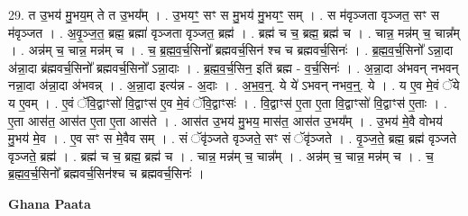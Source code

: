\documentclass[17pt]{extarticle}
\begin{document}
29. त उ॒भय॑ मु॒भय॒म् ते त उ॒भय᳚म् । . उ॒भयꣳ॒॒ सꣳ स मु॒भय॑ मु॒भयꣳ॒॒ सम् । . स म॑वृञ्जता वृञ्जत॒ सꣳ स म॑वृञ्जत । . अ॒वृ॒ञ्ज॒त॒ ब्रह्म॒ ब्रह्मा॑ वृञ्जता वृञ्जत॒ ब्रह्म॑ । . ब्रह्म॑ च च॒ ब्रह्म॒ ब्रह्म॑ च । . चान्न॒ मन्न॑म् च॒ चान्न᳚म् । . अन्न॑म् च॒ चान्न॒ मन्न॑म् च । . च॒ ब्र॒ह्म॒व॒र्च॒सिनो᳚ ब्रह्मवर्च॒सिन॑ श्च च ब्रह्मवर्च॒सिनः॑ । . ब्र॒ह्म॒व॒र्च॒सिनो᳚ ऽन्ना॒दा अ॑न्ना॒दा ब्र॑ह्मवर्च॒सिनो᳚ ब्रह्मवर्च॒सिनो᳚ ऽन्ना॒दाः । . ब्र॒ह्म॒व॒र्च॒सिन॒ इति॑ ब्रह्म - व॒र्च॒सिनः॑ । . अ॒न्ना॒दा अ॑भवन् नभवन् नन्ना॒दा अ॑न्ना॒दा अ॑भवन्न् । . अ॒न्ना॒दा इत्य॑न्न - अ॒दाः । . अ॒भ॒व॒न्॒. ये ये॑ ऽभवन् नभव॒न्॒. ये । . य ए॒व मे॒वं ॅये य ए॒वम् । . ए॒वं ॅवि॒द्वाꣳसो॑ वि॒द्वाꣳस॑ ए॒व मे॒वं ॅवि॒द्वाꣳसः॑ । . वि॒द्वाꣳस॑ ए॒ता ए॒ता वि॒द्वाꣳसो॑ वि॒द्वाꣳस॑ ए॒ताः । . ए॒ता आस॑त॒ आस॑त ए॒ता ए॒ता आस॑ते । . आस॑त उ॒भय॑ मु॒भय॒ मास॑त॒ आस॑त उ॒भय᳚म् । . उ॒भय॑ मे॒वै वोभय॑ मु॒भय॑ मे॒व । . ए॒व सꣳ स मे॒वैव सम् । . सं ॅवृ॑ञ्जते वृञ्जते॒ सꣳ सं ॅवृ॑ञ्जते । . वृ॒ञ्ज॒ते॒ ब्रह्म॒ ब्रह्म॑ वृञ्जते वृञ्जते॒ ब्रह्म॑ । . ब्रह्म॑ च च॒ ब्रह्म॒ ब्रह्म॑ च । . चान्न॒ मन्न॑म् च॒ चान्न᳚म् । . अन्न॑म् च॒ चान्न॒ मन्न॑म् च । . च॒ ब्र॒ह्म॒व॒र्च॒सिनो᳚ ब्रह्मवर्च॒सिन॑श्च च ब्रह्मवर्च॒सिनः॑ । \newline

\textbf{Ghana Paata } \newline
\end{document}
